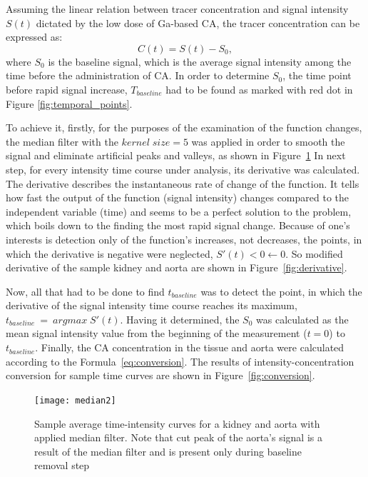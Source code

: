 Assuming the linear relation between tracer concentration and signal intensity $S(t)$ dictated by the low dose of Ga-based CA, the tracer concentration can be expressed as:
\begin{equation}
	\label{eq:conversion}
	C(t) = S(t)-S_0,
\end{equation}
where $S_0$ is the baseline signal, which is the average signal intensity among the time before the administration of CA. 
In order to determine $S_0$, the time point before rapid signal increase, $T_{baseline}$ had to be found  as marked with red dot in Figure \ref{fig:temporal_points}.

To achieve it, firstly, for the purposes of the examination of the function changes, the median filter  with the $kernel\;size = 5$ was applied in order to smooth the signal and eliminate artificial  peaks and valleys, as shown in Figure~\ref{fig:median}  
In next step, for every intensity time course under analysis, its derivative was calculated. The derivative describes the instantaneous rate of change of the function. It tells how fast the output of the function (signal intensity) changes compared to the independent variable (time) \cite{calculus} and seems to be a perfect solution to the problem, which boils down to the finding the most rapid signal change. 
Because of one's interests is detection only of the function's increases, not decreases, the points, in which the derivative is negative were neglected, $S'(t)<0\leftarrow0$. So modified derivative of the sample kidney and aorta are shown in Figure~\ref{fig:derivative}.

Now, all that had to be done to find $t_{baseline}$ was to detect the point, in which the derivative of the signal intensity time course reaches its maximum, $t_{baseline}~=~argmax\;S'(t)$. Having it determined, the $S_0$ was calculated as the mean signal intensity value from the beginning of the measurement ($t=0$) to $t_{baseline}$. Finally, the CA concentration in the tissue and aorta were calculated according to the Formula~\ref{eq:conversion}. The results of intensity-concentration conversion for sample time curves are shown in Figure~\ref{fig:conversion}. 
\begin{figure}[H]
	\centering
	\texttt{[image: median2]}
\caption[Sample average time-intensity curves for a kidney and aorta with applied median filter]{Sample average time-intensity curves for a kidney and aorta with applied median filter. Note that cut peak of the aorta's signal is a result of the median filter and is present only during baseline removal step}
\label{fig:median}
\end{figure}

